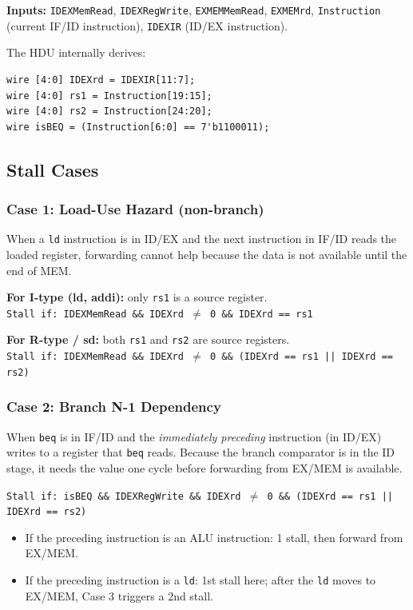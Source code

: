 \documentclass[12pt,a4paper]{article}
\begin{document}
\textbf{Inputs:} \texttt{IDEXMemRead}, \texttt{IDEXRegWrite}, \texttt{EXMEMMemRead}, \texttt{EXMEMrd}, \texttt{Instruction} (current IF/ID instruction), \texttt{IDEXIR} (ID/EX instruction).

The HDU internally derives:
\begin{lstlisting}[style=verilog, numbers=none]
wire [4:0] IDEXrd = IDEXIR[11:7];
wire [4:0] rs1 = Instruction[19:15];
wire [4:0] rs2 = Instruction[24:20];
wire isBEQ = (Instruction[6:0] == 7'b1100011);
\end{lstlisting}

\subsection{Stall Cases}

\subsubsection{Case 1: Load-Use Hazard (non-branch)}
When a \texttt{ld} instruction is in ID/EX and the next instruction in IF/ID reads the loaded register, forwarding cannot help because the data is not available until the end of MEM.

\textbf{For I-type (ld, addi):} only \texttt{rs1} is a source register.\\
\texttt{Stall if: IDEXMemRead \&\& IDEXrd $\neq$ 0 \&\& IDEXrd == rs1}

\textbf{For R-type / sd:} both \texttt{rs1} and \texttt{rs2} are source registers.\\
\texttt{Stall if: IDEXMemRead \&\& IDEXrd $\neq$ 0 \&\& (IDEXrd == rs1 || IDEXrd == rs2)}

\subsubsection{Case 2: Branch N-1 Dependency}
When \texttt{beq} is in IF/ID and the \emph{immediately preceding} instruction (in ID/EX) writes to a register that \texttt{beq} reads. Because the branch comparator is in the ID stage, it needs the value one cycle before forwarding from EX/MEM is available.

\texttt{Stall if: isBEQ \&\& IDEXRegWrite \&\& IDEXrd $\neq$ 0 \&\& (IDEXrd == rs1 || IDEXrd == rs2)}

\begin{itemize}
    \item If the preceding instruction is an ALU instruction: 1 stall, then forward from EX/MEM.
    \item If the preceding instruction is a \texttt{ld}: 1st stall here; after the \texttt{ld} moves to EX/MEM, Case 3 triggers a 2nd stall.
\end{itemize}
\end{document}
